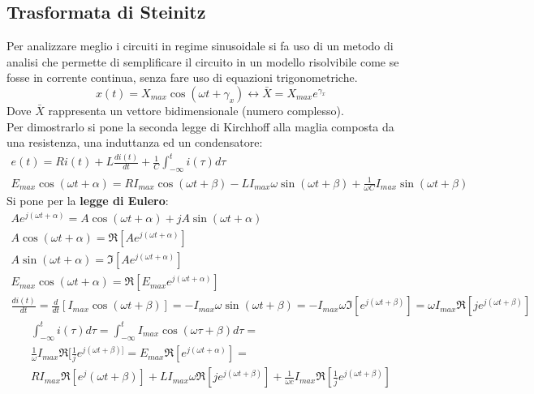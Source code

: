 \documentclass[../main.tex]{subfiles}
\begin{document}
	\subsection{Trasformata di Steinitz}
	Per analizzare meglio i circuiti in regime sinusoidale si fa uso di un metodo di analisi che permette di semplificare il circuito in un modello risolvibile come se fosse in corrente continua, senza fare uso di equazioni trigonometriche.
	\begin{equation}
		\boxed{x(t)=X_{max}\cos(\omega t + \gamma_x)\leftrightarrow \bar X = X_{max} e^{\gamma_x}	}
	\end{equation}
	Dove $\bar X$ rappresenta un vettore bidimensionale (numero complesso).\\
	Per dimostrarlo si pone la seconda legge di Kirchhoff alla maglia composta da una resistenza, una induttanza ed un condensatore:
	\begin{gather}
		e(t)=Ri(t)+L\frac{di(t)}{dt}+\frac{1}{C} \int_{-\infty}^t i(\tau) d\tau	\\
		E_{max}\cos(\omega t + \alpha) = RI_{max} \cos (\omega t + \beta) - LI_{max} \omega \sin(\omega t + \beta) + \frac{1}{\omega C}I_{max} \sin (\omega t + \beta)
	\end{gather}
	Si pone per la \textbf{legge di Eulero}:
	\begin{gather}
		Ae^{j(\omega t + \alpha)} = A\cos (\omega t + \alpha) + j A\sin (\omega t + \alpha) \\
		A\cos(\omega t + \alpha) = \Re [Ae^{j(\omega t + \alpha)}] \\
		A\sin(\omega t + \alpha) = \Im [Ae^{j(\omega t + \alpha)}] \\
		E_{max} \cos(\omega t + \alpha) = \Re [ E_{max}e^{j(\omega t + \alpha)}] \\
		\frac{di(t)}{dt}=\frac{d}{dt}[I_{max}\cos(\omega t + \beta)] = -I_{max} \omega \sin(\omega t + \beta) 
		= -I_{max}\omega \Im[e^{j(\omega t + \beta)}] = \omega I_{max} \Re [je^{j(\omega t + \beta)}] 
	\end{gather}
	\begin{gather}
		\int_{-\infty}^t i(\tau)d\tau = \int_{-\infty}^t I_{max} \cos (\omega \tau + \beta) d\tau = \\
		\frac{1}{\omega} I_{max} \Re [\frac{1}{j}e^{j(\omega t + \beta)]}= E_{max} \Re [e^{j(\omega t + \alpha)}] = \\
		RI_{max} \Re [e^j(\omega t + \beta)] + LI_{max}\omega \Re [je^{j(\omega t + \beta)}] + \frac{1}{\omega c}I_{max} \Re [\frac{1}{j}e^{j(\omega t + \beta)}]
	\end{gather}
\end{document}
